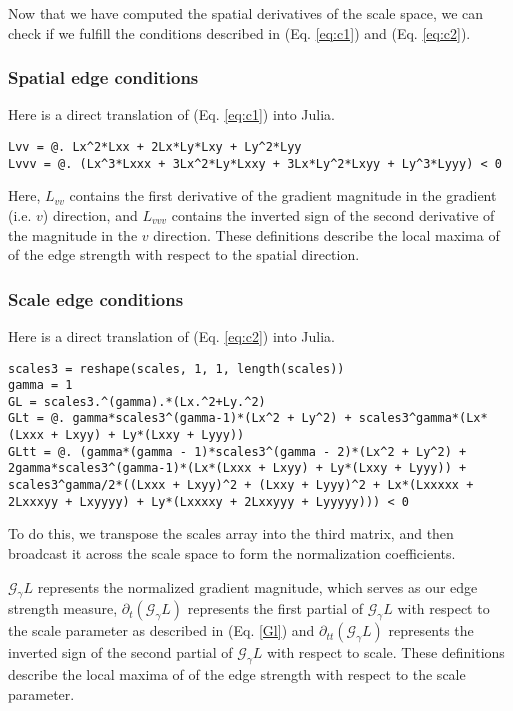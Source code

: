 \documentclass{article}
\begin{document}
Now that we have computed the spatial derivatives of the scale space, we can check if we fulfill the conditions described in (Eq. \ref{eq:c1}) and (Eq. \ref{eq:c2}).

\subsubsection{Spatial edge conditions}
Here is a direct translation of (Eq. \ref{eq:c1}) into Julia.
\begin{lstlisting}
Lvv = @. Lx^2*Lxx + 2Lx*Ly*Lxy + Ly^2*Lyy
Lvvv = @. (Lx^3*Lxxx + 3Lx^2*Ly*Lxxy + 3Lx*Ly^2*Lxyy + Ly^3*Lyyy) < 0
\end{lstlisting}
Here, $L_{vv}$ contains the first derivative of the gradient magnitude in the gradient (i.e. $v$) direction, and $L_{vvv}$ contains the inverted sign of the second derivative of the magnitude in the $v$ direction.
These definitions describe the local maxima of of the edge strength with respect to the spatial direction.

\subsubsection{Scale edge conditions}
Here is a direct translation of (Eq. \ref{eq:c2}) into Julia.
\begin{lstlisting}
scales3 = reshape(scales, 1, 1, length(scales))
gamma = 1
GL = scales3.^(gamma).*(Lx.^2+Ly.^2)
GLt = @. gamma*scales3^(gamma-1)*(Lx^2 + Ly^2) + scales3^gamma*(Lx*(Lxxx + Lxyy) + Ly*(Lxxy + Lyyy))
GLtt = @. (gamma*(gamma - 1)*scales3^(gamma - 2)*(Lx^2 + Ly^2) + 2gamma*scales3^(gamma-1)*(Lx*(Lxxx + Lxyy) + Ly*(Lxxy + Lyyy)) + scales3^gamma/2*((Lxxx + Lxyy)^2 + (Lxxy + Lyyy)^2 + Lx*(Lxxxxx + 2Lxxxyy + Lxyyyy) + Ly*(Lxxxxy + 2Lxxyyy + Lyyyyy))) < 0
\end{lstlisting}
To do this, we transpose the scales array into the third matrix, and then broadcast it across the scale space to form the normalization coefficients.

$\mathcal G_\gamma L$ represents the normalized gradient magnitude, which serves as our edge strength measure, $\partial_t(\mathcal G_\gamma L)$ represents the first partial of $\mathcal G_\gamma L$ with respect to the scale parameter as described in (Eq. \ref{Gl})
and $\partial_{tt}(\mathcal G_\gamma L)$ represents the inverted sign of the second partial of $\mathcal G_\gamma L$ with respect to scale.
These definitions describe the local maxima of of the edge strength with respect to the scale parameter.
\end{document}
